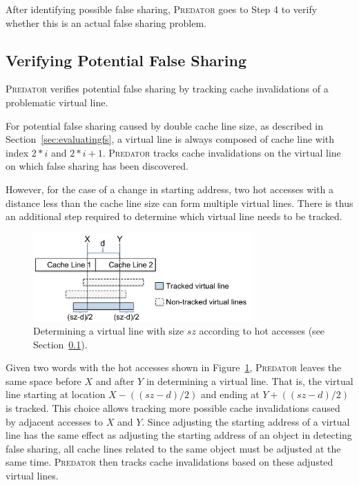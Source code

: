 \documentclass[10pt]{sigplanconf}
\newcommand{\Predator}{{\scshape Predator}}
\begin{document}
After identifying possible false sharing, \Predator{} goes to Step 4 to 
verify whether this is an actual false sharing problem.

\subsection{Verifying Potential False Sharing}
\label{sec:tracking}

\Predator{} verifies potential false sharing by tracking 
cache invalidations of a problematic virtual line.

For potential false sharing caused by double cache line size, as described in
Section~\ref{sec:evaluatingfs}, a virtual line is always composed of 
cache line with index $2*i$ and $2*i+1$. 
\Predator{} tracks cache invalidations
on the virtual line on which false sharing has been discovered.

However, for the case of a change in starting address,
two hot accesses with a distance less than the cache line size 
can form multiple virtual lines. 
There is thus an additional step required to determine which virtual line needs to be tracked.


\begin{figure}
\begin{center} 
\includegraphics[width=3.3in]{fig/trackpotential}
\end{center}
\caption{Determining a virtual line with size $sz$ according to hot accesses (see Section~\ref{sec:tracking}).
\label{fig:trackpotential}}
\end{figure}

Given two words with the hot accesses shown in Figure~\ref{fig:trackpotential}, 
\Predator{} leaves the same space before $X$ and after $Y$ in determining a virtual line. 
That is, the virtual line starting 
at location $X-((sz-d)/2)$ and ending at $Y+((sz-d)/2)$ is tracked. 
This choice allows tracking more possible cache invalidations caused by
adjacent accesses to $X$ and $Y$. 
Since adjusting the starting address of a virtual line has the same effect as
adjusting the starting address of an object in detecting false sharing,
all cache lines related to the same object must be adjusted at the same time.
\Predator{} then tracks cache invalidations based on these adjusted virtual lines.
\end{document}
